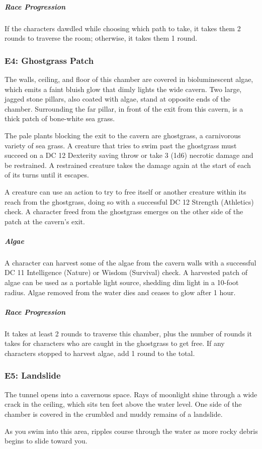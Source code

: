 \documentclass[10pt,a4paper,twoside,bg=print,twocolumn,openany,nodeprecatedcode]{dndbook}
\begin{document}
\subparagraph{Race Progression}
If the characters dawdled while choosing which path to take, it takes them 2 rounds to traverse the room; otherwise, it takes them 1 round.

\subsubsection{E4: Ghostgrass Patch}
\begin{DndReadAloud}{}
The walls, ceiling, and floor of this chamber are covered in bioluminescent algae, which emits a faint bluish glow that dimly lights the wide cavern. Two large, jagged stone pillars, also coated with algae, stand at opposite ends of the chamber. Surrounding the far pillar, in front of the exit from this cavern, is a thick patch of bone-white sea grass.

\end{DndReadAloud}

The pale plants blocking the exit to the cavern are ghostgrass, a carnivorous variety of sea grass. A creature that tries to swim past the ghostgrass must succeed on a DC 12 Dexterity saving throw or take 3 (1d6) necrotic damage and be restrained. A restrained creature takes the damage again at the start of each of its turns until it escapes.

A creature can use an action to try to free itself or another creature within its reach from the ghostgrass, doing so with a successful DC 12 Strength (Athletics) check. A character freed from the ghostgrass emerges on the other side of the patch at the cavern's exit.

\subparagraph{Algae}
A character can harvest some of the algae from the cavern walls with a successful DC 11 Intelligence (Nature) or Wisdom (Survival) check. A harvested patch of algae can be used as a portable light source, shedding dim light in a 10-foot radius. Algae removed from the water dies and ceases to glow after 1 hour.

\subparagraph{Race Progression}
It takes at least 2 rounds to traverse this chamber, plus the number of rounds it takes for characters who are caught in the ghostgrass to get free. If any characters stopped to harvest algae, add 1 round to the total.

\subsubsection{E5: Landslide}
\begin{DndReadAloud}{}
The tunnel opens into a cavernous space. Rays of moonlight shine through a wide crack in the ceiling, which sits ten feet above the water level. One side of the chamber is covered in the crumbled and muddy remains of a landslide.

As you swim into this area, ripples course through the water as more rocky debris begins to slide toward you.

\end{DndReadAloud}
\end{document}
